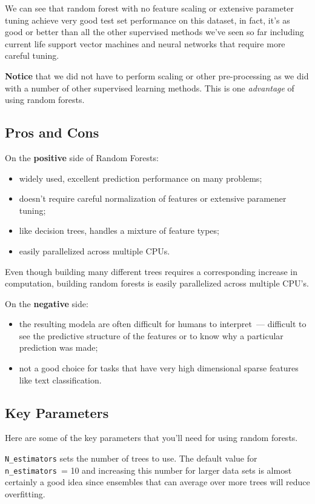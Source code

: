 We can see that random forest with no feature scaling or extensive parameter tuning achieve very good test set performance on this dataset, in fact, it's as good or better than all the other supervised methods we've seen so far including current life support vector machines and neural networks that require more careful tuning. 

\textbf{Notice} that we did not have to perform scaling or other pre-processing as we did with a number of other supervised learning methods. This is one \emph{advantage} of using random forests. 

\subsection{Pros and Cons}

On the \textbf{positive} side of Random Forests:
\begin{itemize}
\item widely used, excellent prediction performance on many problems;
\item doesn't require careful normalization of features or extensive paramener tuning;
\item like decision trees, handles a mixture of feature types;
\item easily parallelized across multiple CPUs.
\end{itemize}

Even though building many different trees requires a corresponding increase in computation, building random forests is easily parallelized across multiple CPU's. 


On the \textbf{negative} side:
\begin{itemize}
\item the resulting modela are often difficult for humans to interpret~--- difficult to see the predictive structure of the features or to know why a particular prediction was made;
\item not a good choice for tasks that have very high dimensional sparse features like text classification.
\end{itemize}

\subsection{Key Parameters}

Here are some of the key parameters that you'll need for using random forests. 

\texttt{N_estimators} sets the number of trees to use. The default value for \texttt{n_estimators}~= 10 and increasing this number for larger data sets is almost certainly a good idea since ensembles that can average over more trees will reduce overfitting. 

